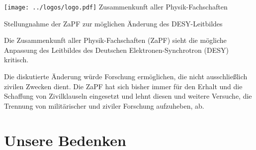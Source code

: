 \documentclass[DIV=calc]{scrartcl}
\begin{document}
\hspace{0.87\textwidth}
\begin{minipage}{120pt}
	\vspace{-1.8cm}
	\texttt{[image: ../logos/logo.pdf]}
	\centering
	\small Zusammenkunft aller Physik-Fachschaften
\end{minipage}

\begin{center}
  \huge{Stellungnahme der ZaPF zur möglichen Änderung des DESY-Leitbildes}\vspace{.25\baselineskip}\\
  \normalsize
\end{center}
\vspace{1cm}







Die Zusammenkunft aller Physik-Fachschaften (ZaPF) sieht die mögliche Anpassung des Leitbildes des Deutschen Elektronen-Synchrotron (DESY) kritisch.

Die diskutierte Änderung würde Forschung ermöglichen, die nicht ausschließlich zivilen Zwecken dient. Die ZaPF hat sich bisher immer für den Erhalt und die Schaffung von Zivilklauseln eingesetzt und lehnt diesen und weitere Versuche, die Trennung von militärischer und ziviler Forschung aufzuheben, ab.

\section*{Unsere Bedenken}
\end{document}
